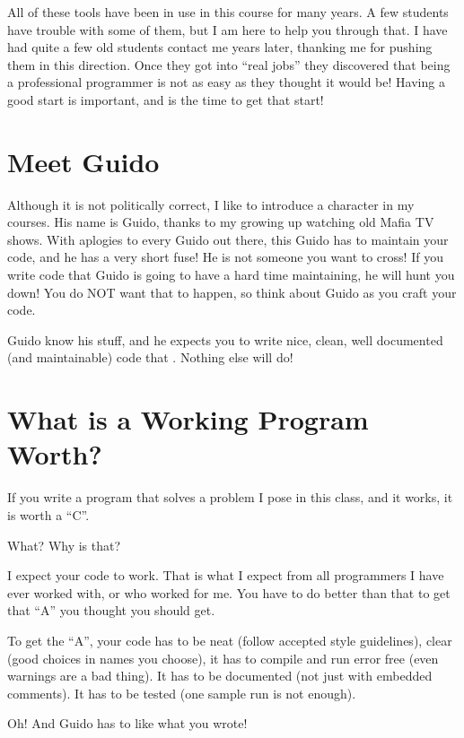 \documentclass[letterpaper,11pt,english]{sphinxmanual}
\begin{document}
All of these tools have been in use in this course for many years. A few
students have trouble with some of them, but I am here to help you through
that. I have had quite a few old students contact me years later, thanking me
for pushing them in this direction. Once they got into “real jobs” they
discovered that being a professional programmer is not as easy as they thought
it would be! Having a good start is important, and  is the time to get
that start!


\section{Meet Guido}
\label{\detokenize{01_introduction/are-you-ready-to-code:meet-guido}}
Although it is not politically correct, I like to introduce a character in my
courses. His name is Guido, thanks to my growing up watching old Mafia TV
shows. With aplogies to every Guido out there, this Guido has to maintain your
code, and he has a very short fuse! He is not someone you want to cross! If you
write code that Guido is going to have a hard time maintaining, he will hunt
you down! You do NOT want that to happen, so think about Guido as you craft
your code.

Guido know his stuff, and he expects you to write nice, clean, well documented
(and maintainable) code that . Nothing else will do!


\section{What is a Working Program Worth?}
\label{\detokenize{01_introduction/are-you-ready-to-code:what-is-a-working-program-worth}}
If you write a program that solves a problem I pose in this class, and it
works, it is worth a “C”.

What? Why is that?

I expect your code to work. That is what I expect from all programmers I have
ever worked with, or who worked for me. You have to do better than that to get
that “A” you thought you should get.

To get the “A”, your code has to be neat (follow accepted style guidelines),
clear (good choices in names you choose), it has to compile and run error free
(even warnings are a bad thing). It has to be documented (not just with
embedded comments). It has to be tested (one sample run is not enough).

Oh! And Guido has to like what you wrote!
\end{document}
